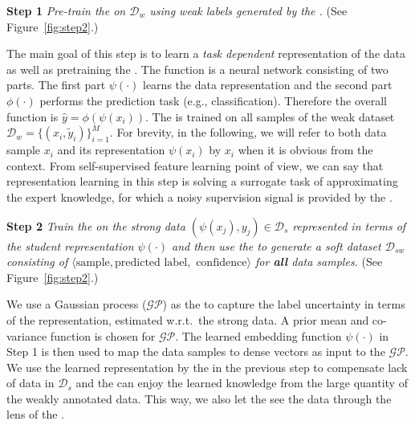 \textbf{Step 1} \emph{Pre-train the \std on $\mathcal{D}_w$ using weak labels generated by the \wa.} (See Figure~\ref{fig:step2}.)

The main goal of this step is to learn a \emph{task dependent} representation of the data as well as pretraining the \std. The \std function is a neural network consisting of two parts. The first part $\psi(\cdot)$ learns the data representation and the second part $\phi(\cdot)$ performs the prediction task (e.g., classification). Therefore the overall function is $\hat{y}=\phi(\psi(x_i))$. The \std is trained on all samples of the weak dataset $\mathcal{D}_w=\{(x_i, \tilde{y}_i)\}_{i=1}^M$. For brevity, in the following, we will refer to both data sample $x_i$ and its representation $\psi(x_i)$ by $x_i$ when it is obvious from the context. 
From self-supervised feature learning point of view, we can say that representation learning in this step is solving a surrogate task of approximating the expert knowledge, for which a noisy supervision signal is provided by the \wa.  


\textbf{Step 2} \emph{Train the \tch on the strong data $(\psi(x_j),y_j) \in \mathcal{D}_s$ represented in terms of the student representation $\psi(\cdot)$ and then use the \tch to generate a soft dataset $\mathcal{D}_{sw}$ consisting of $\langle \textrm{sample}, \textrm{predicted label}, \textrm{ confidence} \rangle$ for \textbf{all} data samples.} (See Figure~\ref{fig:step2}.)

We use a Gaussian process ($\mathcal{GP}$) as the \tch to capture the label uncertainty in terms of the \std representation, estimated w.r.t.\ the strong data. A prior mean and co-variance function is chosen for $\mathcal{GP}$. The learned embedding function $\psi(\cdot)$ in Step 1 is then used to map the data samples to dense vectors as input to the $\mathcal{GP}$. 
We use the learned representation by the \std in the previous step to compensate lack of data in $\mathcal{D}_s$ and the \tch can enjoy the learned knowledge from the large quantity of the weakly annotated data. This way, we also let the \tch  see the data through the lens of the \std.

